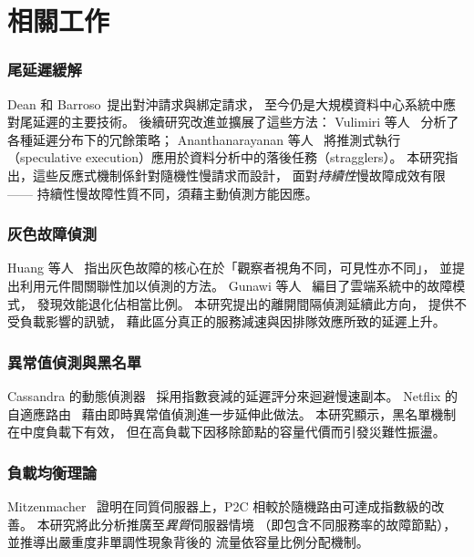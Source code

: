 \section{相關工作}
\label{sec:related}

\subsubsection*{尾延遲緩解}

Dean 和 Barroso~\cite{dean2013tail}提出對沖請求與綁定請求，
至今仍是大規模資料中心系統中應對尾延遲的主要技術。
後續研究改進並擴展了這些方法：
Vulimiri 等人~\cite{vulimiri2013low}
分析了各種延遲分布下的冗餘策略；
Ananthanarayanan 等人~\cite{ananthanarayanan2013effective}
將推測式執行（speculative execution）應用於資料分析中的落後任務（stragglers）。
本研究指出，這些反應式機制係針對隨機性慢請求而設計，
面對\emph{持續性}慢故障成效有限——
持續性慢故障性質不同，須藉主動偵測方能因應。

\subsubsection*{灰色故障偵測}

Huang 等人~\cite{huang2017gray}
指出灰色故障的核心在於「觀察者視角不同，可見性亦不同」，
並提出利用元件間關聯性加以偵測的方法。
Gunawi 等人~\cite{gunawi2018fail}
編目了雲端系統中的故障模式，
發現效能退化佔相當比例。
本研究提出的離開間隔偵測延續此方向，
提供不受負載影響的訊號，
藉此區分真正的服務減速與因排隊效應所致的延遲上升。

\subsubsection*{異常值偵測與黑名單}

Cassandra 的動態偵測器~\cite{lakshman2010cassandra}
採用指數衰減的延遲評分來迴避慢速副本。
Netflix 的自適應路由~\cite{netflix2020zuul}
藉由即時異常值偵測進一步延伸此做法。
本研究顯示，黑名單機制在中度負載下有效，
但在高負載下因移除節點的容量代價而引發災難性振盪。

\subsubsection*{負載均衡理論}

Mitzenmacher~\cite{mitzenmacher2001power}
證明在同質伺服器上，P2C 相較於隨機路由可達成指數級的改善。
本研究將此分析推廣至\emph{異質}伺服器情境
（即包含不同服務率的故障節點），
並推導出嚴重度非單調性現象背後的
流量依容量比例分配機制。

